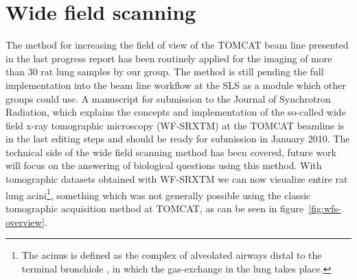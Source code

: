 \documentclass[a4paper,twoside,DIV=calc]{scrartcl}
\begin{document}
\section{Wide field scanning}\label{sec:wfs}
The method for increasing the field of view of the TOMCAT beam line presented in the last progress report has been routinely applied for the imaging of more than 30 rat lung samples by our group. The method is still pending the full implementation into the beam line workflow at the SLS as a module which other groups could use. A manuscript for submission to the Journal of Synchrotron Radiation, which explains the concepts and implementation of the so-called wide field x-ray tomographic microscopy (WF-SRXTM) at the TOMCAT beamline is in the last editing steps and should be ready for submission in January 2010. The technical side of the wide field scanning method has been covered, future work will focus on the answering of biological questions using this method. With tomographic datasets obtained with WF-SRXTM we can now visualize entire rat lung acini\footnote{The acinus is defined as the complex of alveolated airways distal to the terminal bronchiole \cite{Rodriguez1987}, in which the gas-exchange in the lung takes place.}, something which was not generally possible using the classic tomographic acquisition method at TOMCAT, as can be seen in figure~\ref{fig:wfs-overview}.
\end{document}
